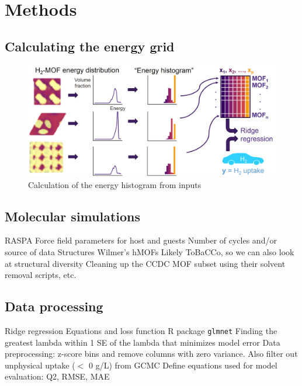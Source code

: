 \documentclass[letterpaper]{article}
\begin{document}
\section{Methods}

\subsection{Calculating the energy grid}

\begin{figure}[H]
	\centering
	\includegraphics[width=0.75\columnwidth]{Figs/energy_schematic.png}
	\caption{Calculation of the energy histogram from inputs}
	\label{fig:schematic}
\end{figure}


\subsection{Molecular simulations}

\begin{outline}
	\1 RASPA
	\1 Force field parameters for host and guests
	\1 Number of cycles and/or source of data
	\1 Structures
		\2 Wilmer's hMOFs
		\2 Likely ToBaCCo, so we can also look at structural diversity
		\2 Cleaning up the CCDC MOF subset using their solvent removal scripts, etc.
\end{outline}


\subsection{Data processing}

\begin{outline}
	\1 Ridge regression
		\2 Equations and loss function
		\2 R package \verb|glmnet|
			\3 Finding the greatest lambda within 1 SE of the lambda that minimizes model error
	\1 Data preprocessing: z-score bins and remove columns with zero variance.  Also filter out unphysical uptake ($<$ 0 g/L) from GCMC
	\1 Define equations used for model evaluation: Q2, RMSE, MAE
\end{outline}
\end{document}
